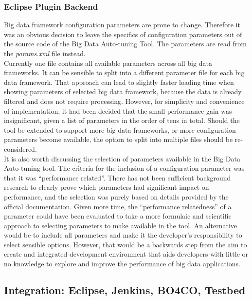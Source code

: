 \subsubsection{Eclipse Plugin Backend}
Big data framework configuration parameters are prone to change. Therefore it was an obvious decision to leave the specifics of configuration parameters out of the source code of the Big Data Auto-tuning Tool. The parameters are read from the \textit{params.xml} file instead.\\
Currently one file contains all available parameters across all big data frameworks. It can be sensible to split into a different parameter file for each big data framework. That approach can lead to slightly faster loading time when showing parameters of selected big data framework, because the data is already filtered and does not require processing. However, for simplicity and convenience of implementation, it had been decided that the small performance gain was insignificant, given a list of parameters in the order of tens in total. Should the tool be extended to support more big data frameworks, or more configuration parameters become available, the option to split into multiple files should be re-considered.\\
It is also worth discussing the selection of parameters available in the Big Data Auto-tuning tool. The criteria for the inclusion of a configuration parameter was that it was ``performance related''. There has not been sufficient background research to clearly prove which parameters had significant impact on performance, and the selection was purely based on details provided by the official documentation. Given more time, the ``performance relatedness'' of a parameter could have been evaluated to take a more formulaic and scientific approach to selecting parameters to make available in the tool. An alternative would be to include all parameters and make it the developer's responsibility to select sensible options. However, that would be a backwards step from the aim to create and integrated development environment that aids developers with little or no knowledge to explore and improve the performance of big data applications.

\newpage
\subsection{Integration: Eclipse, Jenkins, BO4CO, Testbed}
